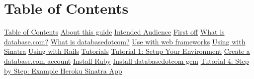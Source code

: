 \documentclass{article}
\begin{document}
 


\hypertarget{table_of_contents}{}\section*{{Table of Contents}}\label{table_of_contents}

\noindent\hyperlink{table_of_contents}{Table of Contents}\dotfill \pageref*{table_of_contents} \linebreak
\noindent\hyperlink{about_this_guide}{About this guide}\dotfill \pageref*{about_this_guide} \linebreak
\noindent\hyperlink{intended_audience}{Intended Audience}\dotfill \pageref*{intended_audience} \linebreak
\noindent\hyperlink{first_off}{First off}\dotfill \pageref*{first_off} \linebreak
\noindent\hyperlink{what_is_databasecom}{What is database.com?}\dotfill \pageref*{what_is_databasecom} \linebreak
\noindent\hyperlink{what_is_databasedotcom}{What is databasedotcom?}\dotfill \pageref*{what_is_databasedotcom} \linebreak
\noindent\hyperlink{use_with_web_frameworks}{Use with web frameworks}\dotfill \pageref*{use_with_web_frameworks} \linebreak
\noindent\hyperlink{using_with_sinatra}{Using with Sinatra}\dotfill \pageref*{using_with_sinatra} \linebreak
\noindent\hyperlink{using_with_rails}{Using with Rails}\dotfill \pageref*{using_with_rails} \linebreak
\noindent\hyperlink{tutorials}{Tutorials}\dotfill \pageref*{tutorials} \linebreak
\noindent\hyperlink{tutorial_1_setup_your_environment}{Tutorial 1: Setup Your Environment}\dotfill \pageref*{tutorial_1_setup_your_environment} \linebreak
\noindent\hyperlink{create_a_databasecom_account}{Create a database.com account}\dotfill \pageref*{create_a_databasecom_account} \linebreak
\noindent\hyperlink{install_ruby}{Install Ruby}\dotfill \pageref*{install_ruby} \linebreak
\noindent\hyperlink{install_databasedotcom_gem}{Install databasedotcom gem}\dotfill \pageref*{install_databasedotcom_gem} \linebreak
\noindent\hyperlink{tutorial_4_step_by_step_example_heroku_sinatra_app}{Tutorial 4: Step by Step: Example Heroku Sinatra App}\dotfill \pageref*{tutorial_4_step_by_step_example_heroku_sinatra_app} \linebreak
\end{document}

